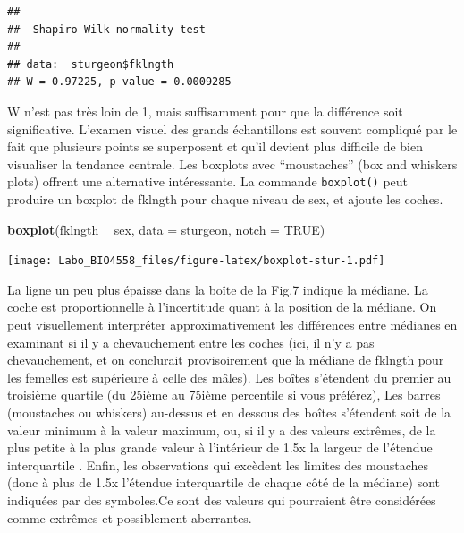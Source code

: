 \documentclass[12pt,]{book}
\newenvironment{Shaded}{\begin{snugshade}}{\end{snugshade}}
\newcommand{\DataTypeTok}[1]{\textcolor[rgb]{0.27,0.27,0.27}{#1}}
\newcommand{\KeywordTok}[1]{\textcolor[rgb]{0.27,0.27,0.27}{\textbf{#1}}}
\newcommand{\NormalTok}[1]{#1}
\newcommand{\OperatorTok}[1]{\textcolor[rgb]{0.43,0.43,0.43}{\textbf{#1}}}
\newcommand{\OtherTok}[1]{\textcolor[rgb]{0.37,0.37,0.37}{#1}}
\newcommand{\StringTok}[1]{\textcolor[rgb]{0.5,0.5,0.5}{#1}}
\begin{document}
\begin{Shaded}
\end{Shaded}

\begin{verbatim}
## 
## 	Shapiro-Wilk normality test
## 
## data:  sturgeon$fklngth
## W = 0.97225, p-value = 0.0009285
\end{verbatim}

W n'est pas très loin de 1, mais suffisamment pour que la différence soit significative.
L'examen visuel des grands échantillons est souvent compliqué par le fait que plusieurs points se superposent et qu'il devient plus difficile de bien visualiser la tendance centrale.
Les boxplots avec ``moustaches'' (box and whiskers plots) offrent une alternative intéressante.
La commande \texttt{boxplot()} peut produire un boxplot de fklngth pour chaque niveau de sex, et ajoute les coches.

\begin{Shaded}
\begin{Highlighting}[]
\KeywordTok{boxplot}\NormalTok{(fklngth }\OperatorTok{~}\StringTok{ }\NormalTok{sex, }\DataTypeTok{data =}\NormalTok{ sturgeon, }\DataTypeTok{notch =} \OtherTok{TRUE}\NormalTok{)}
\end{Highlighting}
\end{Shaded}

\texttt{[image: Labo\_BIO4558\_files/figure-latex/boxplot-stur-1.pdf]}

La ligne un peu plus épaisse dans la boîte de la Fig.7 indique la médiane.
La coche est proportionnelle à l'incertitude quant à la position de la médiane.
On peut visuellement interpréter approximativement les différences entre médianes en examinant si il y a chevauchement entre les coches (ici, il n'y a pas chevauchement, et on conclurait provisoirement que la médiane de fklngth pour les femelles est supérieure à celle des mâles).
Les boîtes s'étendent du premier au troisième quartile (du 25ième au 75ième percentile si vous préférez), Les barres (moustaches ou whiskers) au-dessus et en dessous des boîtes s'étendent soit de la valeur minimum à la valeur maximum, ou, si il y a des valeurs extrêmes, de la plus petite à la plus grande valeur à l'intérieur de 1.5x la largeur de l'étendue interquartile .
Enfin, les observations qui excèdent les limites des moustaches (donc à plus de 1.5x l'étendue interquartile de chaque côté de la médiane) sont indiquées par des symboles.Ce sont des valeurs qui pourraient être considérées comme extrêmes et possiblement aberrantes.
\end{document}
